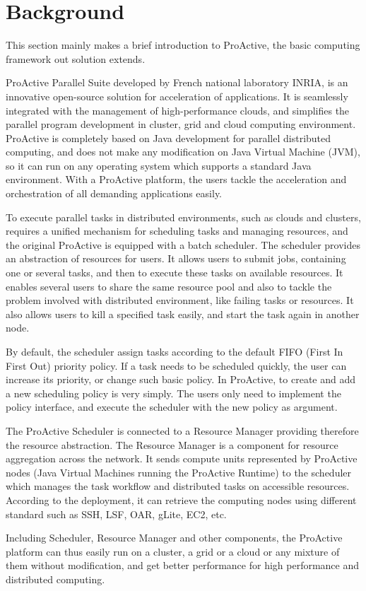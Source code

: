 \section{Background}

This section mainly makes a brief introduction to ProActive, the basic computing framework out solution extends.

ProActive Parallel Suite developed by French national laboratory INRIA, is an innovative open-source solution for acceleration of applications. It is seamlessly integrated with the management of high-performance clouds, and simplifies the parallel program development in cluster, grid and cloud computing environment. ProActive is completely based on Java development for parallel distributed computing, and does not make any modification on Java Virtual Machine (JVM), so it can run on any operating system which supports a standard Java environment. With a ProActive platform, the users tackle the acceleration and orchestration of all demanding applications easily. %

To execute parallel tasks in distributed environments, such as clouds and clusters, requires a unified mechanism for scheduling tasks and managing resources, and the original ProActive is equipped with a batch scheduler. %
The scheduler provides an abstraction of resources for users. It allows users to submit jobs, containing one or several tasks, and then to execute these tasks on available resources. It enables several users to share the same resource pool and also to tackle the problem involved with distributed environment, like failing tasks or resources. It also allows users to kill a specified task easily, and start the task again in another node.

By default, the scheduler assign tasks according to the default FIFO (First In First Out) priority policy. If a task needs to be scheduled quickly, the user can increase its priority, or change such basic policy. In ProActive, to create and add a new scheduling policy is very simply. The users only need to implement the policy interface, and execute the scheduler with the new policy as argument.

The ProActive Scheduler is connected to a Resource Manager providing therefore the resource abstraction. %
The Resource Manager is a component for resource aggregation across the network. It sends compute units represented by ProActive nodes (Java Virtual Machines running the ProActive Runtime)   to the scheduler which manages the task workflow and distributed tasks on accessible resources. According to the deployment, it can retrieve the computing nodes using different standard such as SSH, LSF, OAR, gLite, EC2, etc.

Including Scheduler, Resource Manager and other components, the ProActive platform can thus easily run on a cluster, a grid or a cloud or any mixture of them without modification, and get better performance for high performance and distributed computing.

